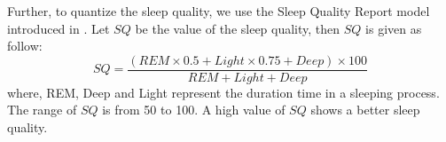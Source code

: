 Further, to quantize the sleep quality, we use the Sleep Quality Report model introduced in \cite{gu2016sleep}. Let $SQ$ be the value of the sleep quality, then $SQ$ is given as follow:
 \begin{equation}
SQ=\frac{(REM \times 0.5+Light \times 0.75+Deep) \times 100}{REM+Light+Deep}
 \end{equation}
where, REM, Deep and Light represent the duration time in a sleeping process. The range of $SQ$ is from 50 to 100. A high value of $SQ$
shows a better  sleep quality.
